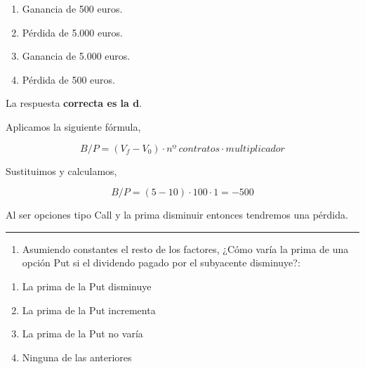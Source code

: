 \documentclass[
  letterpaper,
  DIV=11,
  numbers=noendperiod]{scrreprt}
\providecommand{\tightlist}{%
  \setlength{\itemsep}{0pt}\setlength{\parskip}{0pt}}\usepackage{longtable,booktabs,array}
\begin{document}
\begin{enumerate}
\def\labelenumi{\alph{enumi})}
\item
  Ganancia de 500 euros.
\item
  Pérdida de 5.000 euros.
\item
  Ganancia de 5.000 euros.
\item
  Pérdida de 500 euros.
\end{enumerate}

\begin{tcolorbox}[enhanced jigsaw, left=2mm, opacityback=0, colback=white, breakable, arc=.35mm, bottomrule=.15mm, rightrule=.15mm, toprule=.15mm, leftrule=.75mm, colframe=quarto-callout-tip-color-frame]
\begin{minipage}[t]{5.5mm}
\textcolor{quarto-callout-tip-color}{\faLightbulb}
\end{minipage}%
\begin{minipage}[t]{\textwidth - 5.5mm}

La respuesta \textbf{correcta es la d}.

Aplicamos la siguiente fórmula,

\[B/P=(V_f-V_0)\cdot nº\ contratos\cdot multiplicador\]

Sustituimos y calculamos,

\[B/P=(5-10)\cdot100\cdot 1=-500\]

Al ser opciones tipo Call y la prima disminuir entonces tendremos una
pérdida.

\end{minipage}%
\end{tcolorbox}

\begin{center}\rule{0.5\linewidth}{0.5pt}\end{center}

\begin{enumerate}
\def\labelenumi{\arabic{enumi}.}
\setcounter{enumi}{13}
\tightlist
\item
  Asumiendo constantes el resto de los factores, ¿Cómo varía la prima de
  una opción Put si el dividendo pagado por el subyacente disminuye?:
\end{enumerate}

\begin{enumerate}
\def\labelenumi{\alph{enumi})}
\item
  La prima de la Put disminuye
\item
  La prima de la Put incrementa
\item
  La prima de la Put no varía
\item
  Ninguna de las anteriores
\end{enumerate}
\end{document}
